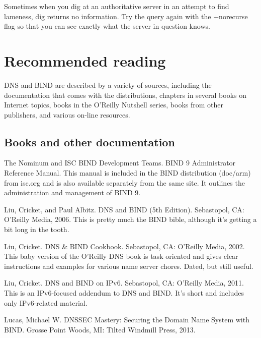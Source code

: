 Sometimes when you {dig} at an authoritative server in an attempt to
find lameness, {dig} returns no information. Try the query again with
the {+norecurse} flag so that you can see exactly what the server in
question knows.



\section{Recommended reading}

DNS and BIND are described by a variety of sources, including the
documentation that comes with the distributions, chapters in several
books on Internet topics, books in the O'Reilly Nutshell series, books
from other publishers, and various on-line resources.

\protect\hypertarget{part0024_split_074.html}{}{}

\hypertarget{part0024_split_074.htmlux5cux23_idContainer1069}{}
\hypertarget{part0024_split_074.htmlux5cux23calibre_pb_73}{%
\subsection[Books and other
documentation]{\texorpdfstring{\protect\hypertarget{part0024_split_074.htmlux5cux23_idTextAnchor968}{}{}Books
and other
documentation}{Books and other documentation}}\label{part0024_split_074.htmlux5cux23calibre_pb_73}}

{The Nominum and ISC BIND Development Teams}. {BIND 9 Administrator
Reference Manual.} This manual is included in the BIND distribution
({doc/arm}) from isc.org and is also available separately from the same
site. It outlines the administration and management of BIND 9.

{Liu, Cricket, and Paul Albitz}. {DNS and BIND (5th Edition).}
Sebastopol, CA: O'Reilly Media, 2006. This is pretty much the BIND
bible, although it's getting a bit long in the tooth.

{Liu, Cricket. }{DNS \& BIND Cookbook}. Sebastopol, CA: O'Reilly Media,
2002. This baby version of the O'Reilly DNS book is task oriented and
gives clear instructions and examples for various name server chores.
Dated, but still useful.

{Liu, Cricket}. {DNS and BIND on IPv6. }Sebastopol, CA: O'Reilly Media,
2011. This is an IPv6-focused addendum to DNS and BIND. It's short and
includes only IPv6-related material.

{Lucas, Michael W. }{DNSSEC Mastery: Securing the Domain Name System
with BIND}. Grosse Point Woods, MI: Tilted Windmill Press, 2013.

